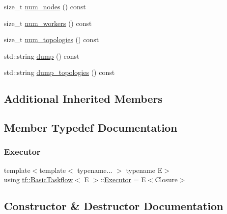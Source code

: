 \begin{DoxyCompactItemize}
\item 
size\+\_\+t \hyperlink{classtf_1_1BasicTaskflow_a18341302575dcb719e455d84a738273f}{num\+\_\+nodes} () const
\item 
size\+\_\+t \hyperlink{classtf_1_1BasicTaskflow_a9cef9ee3d27ffc78bfa953c8ed25b559}{num\+\_\+workers} () const
\item 
size\+\_\+t \hyperlink{classtf_1_1BasicTaskflow_a7e97ed52d9d0470d2751f32748adb253}{num\+\_\+topologies} () const
\item 
std\+::string \hyperlink{classtf_1_1BasicTaskflow_a913a31040546bcf9d6e044580d170722}{dump} () const
\item 
std\+::string \hyperlink{classtf_1_1BasicTaskflow_ae4c67b7bc87564e8b5b309837f4b6d78}{dump\+\_\+topologies} () const
\end{DoxyCompactItemize}
\subsection*{Additional Inherited Members}


\subsection{Member Typedef Documentation}
\mbox{\label{classtf_1_1BasicTaskflow_ab183cd063ba999ac62b5d4e9bb89247d}} 
\subsubsection{\texorpdfstring{Executor}{Executor}}
{\footnotesize\ttfamily template$<$template$<$ typename... $>$ typename E$>$ \\
using \hyperlink{classtf_1_1BasicTaskflow}{tf\+::\+Basic\+Taskflow}$<$ E $>$\+::\hyperlink{classtf_1_1BasicTaskflow_ab183cd063ba999ac62b5d4e9bb89247d}{Executor} =  E$<$Closure$>$}



\subsection{Constructor \& Destructor Documentation}
\mbox{\label{classtf_1_1BasicTaskflow_ab077a9419b9cb6cbc9f9647c621c8c71}} 
